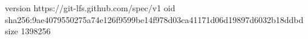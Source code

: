 version https://git-lfs.github.com/spec/v1
oid sha256:9ae4079550275a74e126f9599be14f978d03ca41171d06d19897d6032b18ddbd
size 1398256
